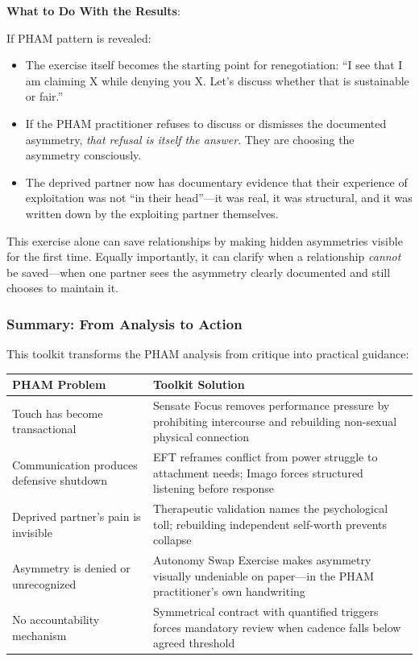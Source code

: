 \documentclass[12pt, letterpaper]{article}
\begin{document}
\textbf{What to Do With the Results}:

If PHAM pattern is revealed:
\begin{itemize}
    \item The exercise itself becomes the starting point for renegotiation: ``I see that I am claiming X while denying you X. Let's discuss whether that is sustainable or fair.''
    \item If the PHAM practitioner refuses to discuss or dismisses the documented asymmetry, \textit{that refusal is itself the answer}. They are choosing the asymmetry consciously.
    \item The deprived partner now has documentary evidence that their experience of exploitation was not ``in their head''---it was real, it was structural, and it was written down by the exploiting partner themselves.
\end{itemize}

This exercise alone can save relationships by making hidden asymmetries visible for the first time. Equally importantly, it can clarify when a relationship \textit{cannot} be saved---when one partner sees the asymmetry clearly documented and still chooses to maintain it.

\subsubsection{Summary: From Analysis to Action}

This toolkit transforms the PHAM analysis from critique into practical guidance:

\begin{center}
\begin{tabular}{|p{2.2in}|p{3.3in}|}
\hline
\textbf{PHAM Problem} & \textbf{Toolkit Solution} \\
\hline
Touch has become transactional & Sensate Focus removes performance pressure by prohibiting intercourse and rebuilding non-sexual physical connection \\
\hline
Communication produces defensive shutdown & EFT reframes conflict from power struggle to attachment needs; Imago forces structured listening before response \\
\hline
Deprived partner's pain is invisible & Therapeutic validation names the psychological toll; rebuilding independent self-worth prevents collapse \\
\hline
Asymmetry is denied or unrecognized & Autonomy Swap Exercise makes asymmetry visually undeniable on paper---in the PHAM practitioner's own handwriting \\
\hline
No accountability mechanism & Symmetrical contract with quantified triggers forces mandatory review when cadence falls below agreed threshold \\
\hline
\end{tabular}
\end{center}
\end{document}
